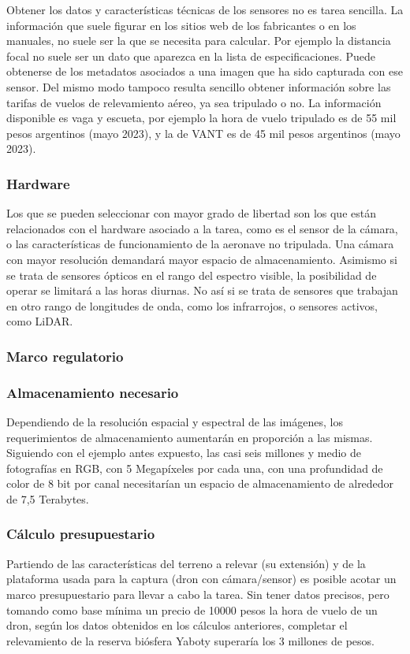 Obtener los datos y características técnicas de los sensores no es tarea sencilla. La información que suele figurar en los sitios web de los fabricantes o en los manuales, no suele ser la que se necesita para calcular. Por ejemplo la distancia focal no suele ser un dato que aparezca en la lista de especificaciones. Puede obtenerse de los metadatos asociados a una imagen que ha sido capturada con ese sensor.
Del mismo modo tampoco resulta sencillo obtener información sobre las tarifas de vuelos de relevamiento aéreo, ya sea tripulado o no. La información disponible es vaga y escueta, por ejemplo la hora de vuelo tripulado es de 55 mil pesos argentinos (mayo 2023), y la de VANT es de 45 mil pesos argentinos (mayo 2023).
\subsubsection{Hardware}
Los que se pueden seleccionar con mayor grado de libertad son los que están relacionados con el hardware asociado a la tarea, como es el sensor de la cámara, o las características de funcionamiento de la aeronave no tripulada. Una cámara con mayor resolución demandará mayor espacio de almacenamiento. Asimismo si se trata de sensores ópticos en el rango del espectro visible, la posibilidad de operar se limitará a las horas diurnas. No así si se trata de sensores que trabajan en otro rango de longitudes de onda, como los infrarrojos, o sensores activos, como LiDAR.
\subsubsection{Marco regulatorio}

\subsubsection{Almacenamiento necesario}
Dependiendo de la resolución espacial y espectral de las imágenes, los requerimientos de almacenamiento aumentarán en proporción a las mismas. Siguiendo con el ejemplo antes expuesto, las casi seis millones y medio de fotografías en RGB, con 5 Megapíxeles por cada una, con una profundidad de color de 8 bit por canal necesitarían un espacio de almacenamiento de alrededor de 7,5 Terabytes.
\subsubsection{Cálculo presupuestario}
Partiendo de las características del terreno a relevar (su extensión) y de la plataforma usada para la captura (dron con cámara/sensor) es posible acotar un marco presupuestario para llevar a cabo la tarea. Sin tener datos precisos, pero tomando como base mínima un precio de 10000 pesos la hora de vuelo de un dron, según los datos obtenidos en los cálculos anteriores, completar el relevamiento de la reserva biósfera Yaboty superaría los 3 millones de pesos.


